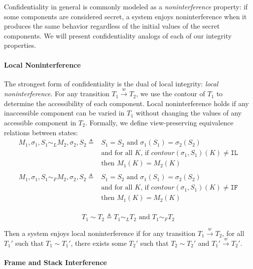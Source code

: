 \documentclass{article}
\begin{document}
    Confidentiality in general is commonly modeled as a {\it noninterference} property: if some components
    are considered secret, a system enjoys noninterference when it produces the same behavior regardless
    of the initial values of the secret components. We will present confidentiality analogs of each of our
    integrity properties.

    \paragraph{Local Noninterference}

      The strongest form of confidentiality is the dual of local integrity: {\it local noninterference}.
      For any transition \(T_1 \xrightarrow{w} T_2\), we use the contour of \(T_1\) to determine the accessibility
      of each component. Local noninterference holds if any inaccessible component can be varied in \(T_1\) without
      changing the values of any accessible component in \(T_2\). Formally, we define view-preserving
      equivalence relations between states:
      \[\begin{split}
        M_1,\sigma_1,S_1 \sim_L M_2,\sigma_2,S_2 \triangleq & S_1 = S_2 \text{ and } \sigma_1(S_1) = \sigma_2(S_2) \\
        & \text{and for all } K \text{, if } \mathit{contour}(\sigma_1,S_1)(K) \not = \mathtt{IL} \\
        & \text{then } M_1(K) = M_2(K) \\
      \end{split}\]
      \[\begin{split}
        M_1,\sigma_1,S_1 \sim_F M_2,\sigma_2,S_2 \triangleq & S_1 = S_2 \text{ and } \sigma_1(S_1) = \sigma_2(S_2) \\
        & \text{and for all } K \text{, if } \mathit{contour}(\sigma_1,S_1)(K) \not = \mathtt{IF} \\
        & \text{then } M_1(K) = M_2(K) \\
      \end{split}\]

      \[T_1 \sim T_2 \triangleq T_1 \sim_L T_2 \text{ and } T_1 \sim_F T_2\]

      Then a system enjoys local noninterference if for any transition \(T_1 \xrightarrow{w} T_2\), for all
      \(T_1'\) such that \(T_1 \sim T_1'\), there exists some \(T_2'\) such that \(T_2 \sim T_2'\) and
      \(T_1' \xrightarrow{w} T_2'\).

    \paragraph{Frame and Stack Interference}
\end{document}
